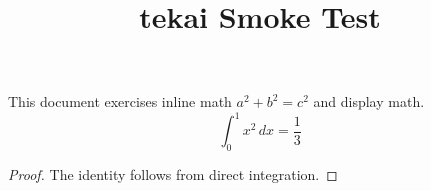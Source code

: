 \documentclass{article}
\title{tekai Smoke Test}
\author{}
\date{}
\begin{document}
\maketitle

This document exercises inline math \(a^2 + b^2 = c^2\) and display math.
\[
  \int_0^1 x^2\,dx = \frac{1}{3}
\]

\begin{proof}
  The identity follows from direct integration.
\end{proof}
\end{document}
